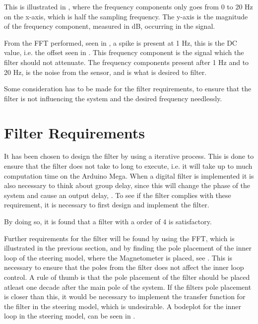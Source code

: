 This is illustrated in , where the frequency components only goes from 0 to 20 Hz on the x-axis, which is half the sampling frequency. The y-axis is the magnitude of the frequency component, measured in \si{dB}, occurring in the signal.

From the FFT performed, seen in , a spike is present at 1 \si{Hz}, this is the DC value, i.e. the offset seen in . This frequency component is the signal which the filter should not attenuate. The frequency components present after 1 Hz and to 20 Hz, is the noise from the sensor, and is what is desired to filter. 

Some consideration has to be made for the filter requirements, to ensure that the filter is not influencing the system and the desired frequency needlessly.

\section{Filter Requirements} \label{sec:FilterRequirements}
It has been chosen to design the filter by using a iterative process. This is done to ensure that the filter does not take to long to execute, i.e. it will take up to much computation time on the Arduino Mega. When a digital filter is implemented it is also necessary to think about group delay, since this will change the phase of the system and cause an output delay, . To see if the filter complies with these requirement, it is necessary to first design and implement the filter.

By doing so, it is found that a filter with a order of 4 is satisfactory.

Further requirements for the filter will be found by using the FFT, which is illustrated in the previous section, and by finding the pole placement of the  inner loop of the steering model, where the Magnetometer is placed, see . This is necessary to ensure that the poles from the filter does not affect the inner loop control. A rule of thumb is that the pole placement of the filter should be placed atleast one decade after the main pole of the system. If the filters pole placement is closer than this, it would be necessary to implement the transfer function for the filter in the steering model, which is undesirable. A bodeplot for the inner loop in the steering model, can be seen in .

